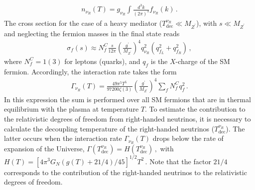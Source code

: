 \documentclass[12pt]{article}
\begin{document}
\begin{align*}
n_{\nu_R}(T) = g_{\nu_R} \int \frac{d^{3} k}{(2 \pi)^{3}} f_{\nu_R}(k)\,.
\end{align*}
The cross section for the case of a heavy mediator ($T^{\nu_R}_{\text{dec}} \ll M_{Z^{\prime}}$), with $s \ll M_{Z^{\prime}}$ and neglecting the fermion masses in the final state reads~\cite{Barger:2003zh}
%
\begin{align}
    \sigma_{f}(s) \approx N^{C}_{f} \frac{s}{12 \pi} \left( \frac{g^{\prime}}{M_{Z^{\prime}}} \right)^{4} q^{2}_{\nu_R} (q^{2}_{f_L} + q^{2}_{f_R})\,,
\end{align}
%
where $N^{C}_{f}=1(3)$ for leptons (quarks),
and $q_{f}$ is the $X$-charge of the SM fermion.  
Accordingly, the interaction rate takes the form
%
\begin{align}
    \Gamma_{\nu_{R}}(T) = \frac{49 \pi^{5} T^{5}}{97200 \zeta(3)} \left( \frac{g^{\prime}}{M_{Z^{\prime}}} \right)^{4} \sum_{f} N^{C}_{f} q^{2}_{f}\,.
\end{align}
%
In this expression the sum is performed over all SM fermions that are in thermal equilibrium with the plasma at temperature $T$. To estimate the contribution to the relativistic degrees of freedom from right-handed neutrinos, it is necessary to calculate the decoupling temperature of the right-handed neutrinos ($T^{\nu_R}_{\text{dec}}$). The latter occurs when the interaction rate $\Gamma_{\nu_{R}}(T)$ drops below the rate of expansion of the Universe, $\Gamma(T^{\nu_R}_{\text{dec}}) = H(T^{\nu_R}_{\text{dec}})\,, $
%
%
%
with $H(T)= [4 \pi^{3} G_{N}(g(T) + 21/4)/45]^{1/2} T^{2}\,.$
%
%
Note that the factor $21/4$ corresponds to the contribution of the right-handed neutrinos to the relativistic degrees of freedom. 
\end{document}

